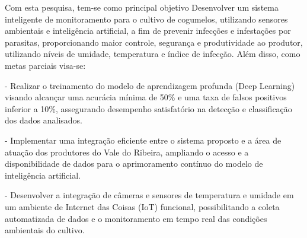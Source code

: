 Com esta pesquisa, tem-se como principal objetivo Desenvolver um sistema inteligente de monitoramento para o cultivo de cogumelos, utilizando sensores ambientais e inteligência artificial, a fim de prevenir infecções e infestações por parasitas, proporcionando maior controle, segurança e produtividade ao produtor, utilizando níveis de umidade, temperatura e índice de infecção. Além disso, como metas parciais visa-se:

- Realizar o treinamento do modelo de aprendizagem profunda (Deep Learning) visando alcançar uma acurácia mínima de 50\% e uma taxa de falsos positivos inferior a 10\%, assegurando desempenho satisfatório na detecção e classificação dos dados analisados. 

- Implementar uma integração eficiente entre o sistema proposto e a área de atuação dos produtores do Vale do Ribeira, ampliando o acesso e a disponibilidade de dados para o aprimoramento contínuo do modelo de inteligência artificial. 

- Desenvolver a integração de câmeras e sensores de temperatura e umidade em um ambiente de Internet das Coisas (IoT) funcional, possibilitando a coleta automatizada de dados e o monitoramento em tempo real das condições ambientais do cultivo. 